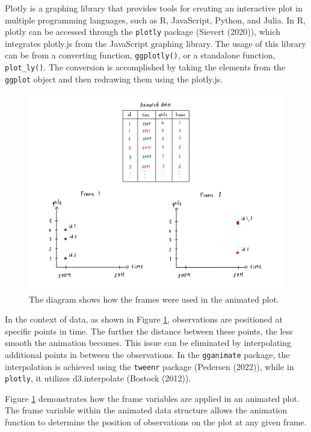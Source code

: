 Plotly is a graphing library that provides tools for creating an interactive plot in multiple programming languages, such as R, JavaScript, Python, and Julia. In R, plotly can be accessed through the \texttt{plotly} package (Sievert (2020)), which integrates plotly.js from the JavaScript graphing library. The usage of this library can be from a converting function, \texttt{ggplotly()}, or a standalone function, \texttt{plot\_ly()}. The conversion is accomplished by taking the elements from the \texttt{ggplot} object and then redrawing them using the plotly.js.

\begin{figure}

{\centering \includegraphics[width=1\linewidth]{figures/animated-diagram} 

}

\caption{The diagram shows how the frames were used in the animated plot.}\label{fig:animated-diagram}
\end{figure}

In the context of data, as shown in Figure \ref{fig:animated-diagram}, observations are positioned at specific points in time. The further the distance between these points, the less smooth the animation becomes. This issue can be eliminated by interpolating additional points in between the observations. In the \texttt{gganimate} package, the interpolation is achieved using the \texttt{tweenr} package (Pedersen (2022)), while in \texttt{plotly}, it utilizes d3.interpolate (Bostock (2012)).

Figure \ref{fig:animated-diagram} demonstrates how the frame variables are applied in an animated plot. The frame variable within the animated data structure allows the animation function to determine the position of observations on the plot at any given frame.

